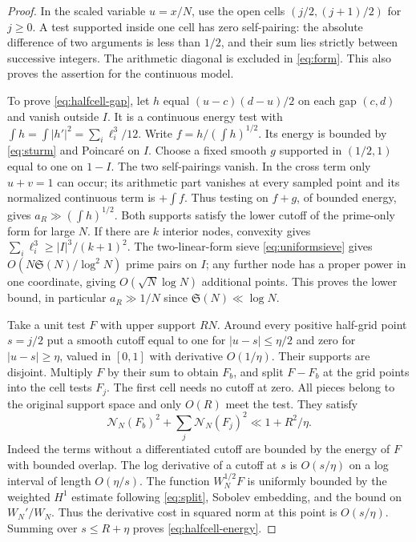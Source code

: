 \documentclass[11pt,a4paper]{article}
\numberwithin{equation}{section}
\newcommand{\SSS}{\mathfrak S}
\newcommand{\NN}{\mathcal N_N}
\begin{document}
\begin{proof}
In the scaled variable $u=x/N$, use the open cells
$(j/2,(j+1)/2)$ for $j\ge0$. A test supported inside one cell
has zero self-pairing: the absolute difference of two arguments
is less than $1/2$, and their sum lies strictly between successive
integers. The arithmetic diagonal is excluded in \cref{eq:form}.
This also proves the assertion for the continuous model.

To prove \eqref{eq:halfcell-gap}, let $h$ equal
$(u-c)(d-u)/2$ on each gap $(c,d)$ and vanish outside $I$.
It is a continuous energy test with
$\int h=\int |h'|^2=\sum_i\ell_i^3/12$. Write $f=h/(\int h)^{1/2}$.
Its energy is bounded by \eqref{eq:sturm} and Poincar\'e on $I$.
Choose a fixed smooth $g$ supported in $(1/2,1)$ equal to one
on $1-I$. The two self-pairings vanish. In the cross term only
$u+v=1$ can occur; its arithmetic part vanishes at every sampled
point and its normalized continuous term is $+\int f$.
Thus testing on $f+g$, of bounded energy, gives
$a_R\gg(\int h)^{1/2}$. Both supports satisfy the lower cutoff
of the prime-only form for large $N$. If there are $k$ interior
nodes, convexity gives $\sum_i\ell_i^3\ge |I|^3/(k+1)^2$.
The two-linear-form sieve \eqref{eq:uniformsieve} gives
$O(N\SSS(N)/\log^2 N)$ prime pairs on $I$; any further node
has a proper power in one coordinate, giving $O(\sqrt N\log N)$
additional points. This proves the lower bound, in particular
$a_R\gg 1/N$ since $\SSS(N)\ll\log N$.

Take a unit test $F$ with upper support $RN$. Around every
positive half-grid point $s=j/2$ put a smooth cutoff equal to one
for $|u-s|\le\eta/2$ and zero for $|u-s|\ge\eta$, valued in
$[0,1]$ with derivative $O(1/\eta)$. Their supports are disjoint.
Multiply $F$ by their sum to obtain $F_b$, and split $F-F_b$
at the grid points into the cell tests $F_j$. The first cell
needs no cutoff at zero. All pieces belong to the original
support space and only $O(R)$ meet the test. They satisfy
\begin{equation}
 \NN(F_b)^2+\sum_j\NN(F_j)^2\ll 1+R^2/\eta .
 \label{eq:halfcell-energy}
\end{equation}
Indeed the terms without a differentiated cutoff are bounded
by the energy of $F$ with bounded overlap. The log derivative
of a cutoff at $s$ is $O(s/\eta)$ on a log interval of length
$O(\eta/s)$. The function $W_N^{1/2}F$ is uniformly bounded
by the weighted $H^1$ estimate following \eqref{eq:split},
Sobolev embedding, and the bound on $W_N'/W_N$.
Thus the derivative cost in squared norm at this point is
$O(s/\eta)$. Summing over $s\le R+\eta$ proves
\cref{eq:halfcell-energy}.


\end{proof}
\end{document}

